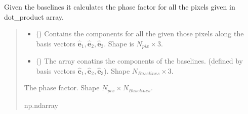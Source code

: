 \documentclass[a4paper,11pt,oneside,english,openany]{sphinxmanual}
\begin{document}

\begin{fulllineitems}
\label{\detokenize{simvis:simvis.calculate_phase}}
\pysigstartsignatures
{}
\pysigstopsignatures
\sphinxAtStartPar
Given the baselines it calculates the phase factor for all the pixels given in dot\_product array.
\begin{quote}\begin{description}
\begin{itemize}
\item {} 
\sphinxAtStartPar
{} () \textendash{} Contains the  components for all the given those pixels along the basis vectors \(\hat{\mathbf{e}}_1,\hat{\mathbf{e}}_2,\hat{\mathbf{e}}_3\). Shape is \(N_{pix} \times 3\).

\item {} 
\sphinxAtStartPar
{} () \textendash{} The array conatins the components of the baselines. (defined by basis vectors \(\hat{\mathbf{e}}_1,\hat{\mathbf{e}}_2,\hat{\mathbf{e}}_3\)).
Shape \(N_{Baselines}\times 3\).

\end{itemize}

\sphinxAtStartPar
The phase factor. Shape \(N_{pix} \times  N_{Baselines}\).

\sphinxAtStartPar
np.ndarray

\end{description}\end{quote}

\end{fulllineitems}

\end{document}
